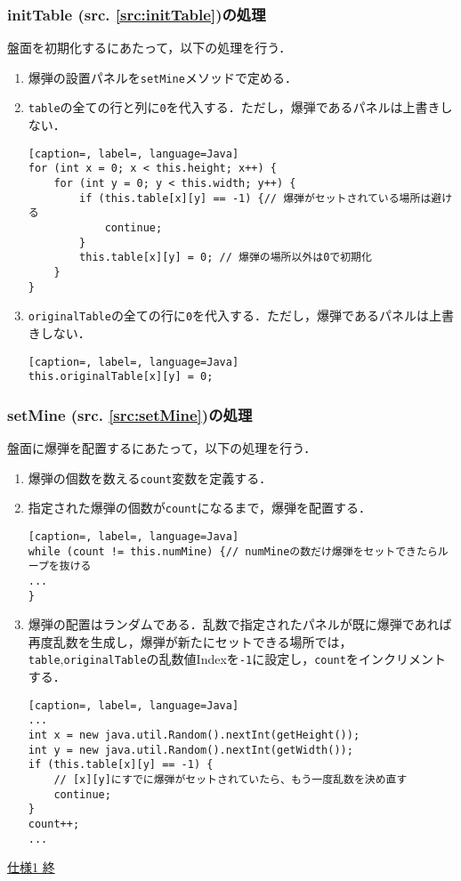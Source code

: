 \documentclass[a4j,11pt]{jsarticle}
\newcommand{\srcref}[1]{src. \ref{#1}}
\newcommand{\met}[1]{\ttfamily #1 \normalfont (\srcref{src:#1})の処理}
\begin{document}
\subsubsection*{\met{initTable}}
盤面を初期化するにあたって，以下の処理を行う．
\begin{enumerate}
    \renewcommand{\labelenumi}{\arabic{enumi})}
    \item 爆弾の設置パネルを\verb|setMine|メソッドで定める．
    \item \verb|table|の全ての行と列に\verb|0|を代入する．ただし，爆弾であるパネルは上書きしない．
          \begin{lstlisting}[caption=, label=, language=Java]
for (int x = 0; x < this.height; x++) {
    for (int y = 0; y < this.width; y++) {
        if (this.table[x][y] == -1) {// 爆弾がセットされている場所は避ける
            continue;
        }
        this.table[x][y] = 0; // 爆弾の場所以外は0で初期化
    }
}
    \end{lstlisting}
    \item \verb|originalTable|の全ての行に\verb|0|を代入する．ただし，爆弾であるパネルは上書きしない．
          \begin{lstlisting}[caption=, label=, language=Java]
this.originalTable[x][y] = 0;
    \end{lstlisting}
\end{enumerate}
\subsubsection*{\met{setMine}}
盤面に爆弾を配置するにあたって，以下の処理を行う．
\begin{enumerate}
    \renewcommand{\labelenumi}{\arabic{enumi})}
    \item 爆弾の個数を数える\verb|count|変数を定義する．
    \item 指定された爆弾の個数が\verb|count|になるまで，爆弾を配置する．
          \begin{lstlisting}[caption=, label=, language=Java]
while (count != this.numMine) {// numMineの数だけ爆弾をセットできたらループを抜ける
...
}
    \end{lstlisting}
    \item 爆弾の配置はランダムである．乱数で指定されたパネルが既に爆弾であれば再度乱数を生成し，爆弾が新たにセットできる場所では，\verb|table|,\verb|originalTable|の乱数値Indexを\verb|-1|に設定し，\verb|count|をインクリメントする．
          \begin{lstlisting}[caption=, label=, language=Java]
...
int x = new java.util.Random().nextInt(getHeight());
int y = new java.util.Random().nextInt(getWidth());
if (this.table[x][y] == -1) {
    // [x][y]にすでに爆弾がセットされていたら、もう一度乱数を決め直す
    continue;
}
count++;
...
    \end{lstlisting}
\end{enumerate}
\begin{flushright}
    \underline{仕様1 終}
\end{flushright}
\newpage
\end{document}
